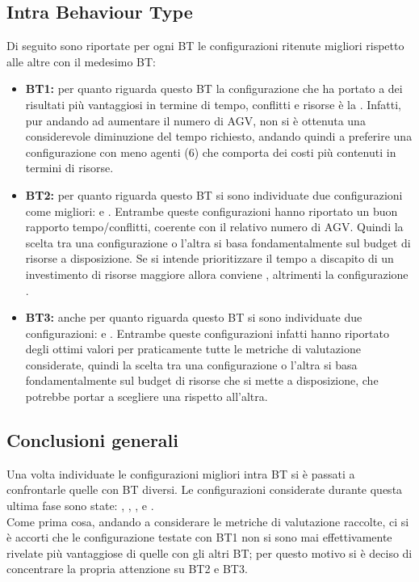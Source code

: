\documentclass[12pt]{article}
\begin{document}
\subsection{Intra Behaviour Type}
Di seguito sono riportate per ogni BT le configurazioni ritenute migliori rispetto alle altre con il medesimo BT: 
\begin{itemize}
\item \textbf{BT1:} per quanto riguarda questo BT la configurazione che ha portato a dei risultati più vantaggiosi in termine di tempo, conflitti e risorse è la . Infatti, pur andando ad aumentare il numero di AGV, non si è ottenuta una considerevole diminuzione del tempo richiesto, andando quindi a preferire una configurazione con meno agenti (6) che comporta dei costi più contenuti in termini di risorse.

\item \textbf{BT2:} per quanto riguarda questo BT si sono individuate due configurazioni come migliori:  e . Entrambe queste configurazioni hanno riportato un buon rapporto tempo/conflitti, coerente con il relativo numero di AGV. Quindi la scelta tra una configurazione o l'altra si basa fondamentalmente sul budget di risorse a disposizione. Se si intende prioritizzare il tempo a discapito di un investimento di risorse maggiore allora conviene , altrimenti la configurazione . 

\item \textbf{BT3:} anche per quanto riguarda questo BT si sono individuate due configurazioni:  e . Entrambe queste configurazioni infatti hanno riportato degli ottimi valori per praticamente tutte le metriche di valutazione considerate, quindi la scelta tra una configurazione o l'altra si basa fondamentalmente sul budget di risorse che si mette a disposizione, che potrebbe portar a scegliere una rispetto all'altra.
\end{itemize}

\subsection{Conclusioni generali}
Una volta individuate le configurazioni migliori intra BT si è passati a confrontarle quelle con BT diversi. Le configurazioni considerate durante questa ultima fase sono state: , , ,  e .\\
\noindent Come prima cosa, andando a considerare le metriche di valutazione raccolte, ci si è accorti che le configurazione testate con BT1 non si sono mai effettivamente rivelate più vantaggiose di quelle con gli altri BT; per questo motivo si è deciso di concentrare la propria attenzione su BT2 e BT3. \\
\end{document}
